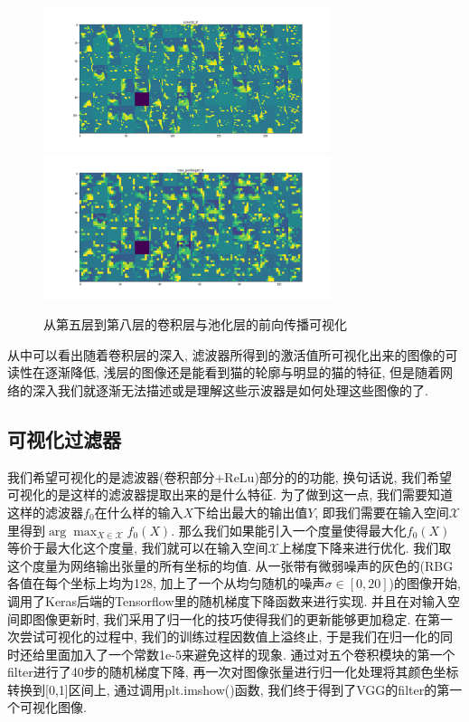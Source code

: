 \documentclass[lang=cn,11pt]{elegantpaper}
\begin{document}
\begin{figure}[hbtp]
  \includegraphics[width=0.75\textwidth]{conv2d_8}\\
  \includegraphics[width=0.75\textwidth]{max_pooling2d_8}
  \caption{从第五层到第八层的卷积层与池化层的前向传播可视化\label{fig:forward1}}
\end{figure}

从中可以看出随着卷积层的深入, 滤波器所得到的激活值所可视化出来的图像的可读性在逐渐降低, 浅层的图像还是能看到猫的轮廓与明显的猫的特征, 但是随着网络的深入我们就逐渐无法描述或是理解这些示波器是如何处理这些图像的了.







\subsection{可视化过滤器}

我们希望可视化的是滤波器(卷积部分+ReLu)部分的的功能, 换句话说, 我们希望可视化的是这样的滤波器提取出来的是什么特征. 为了做到这一点, 我们需要知道这样的滤波器$f_0$在什么样的输入$X$下给出最大的输出值$Y$, 即我们需要在输入空间$\mathcal X$里得到$\arg \max_{X\in \mathcal X} f_0(X)$. 那么我们如果能引入一个度量使得最大化$f_0(X)$等价于最大化这个度量, 我们就可以在输入空间$\mathcal X$上梯度下降来进行优化. 我们取这个度量为网络输出张量的所有坐标的均值. 从一张带有微弱噪声的灰色的(RBG各值在每个坐标上均为128, 加上了一个从均匀随机的噪声$\sigma\in[0,20]$)的图像开始, 调用了Keras后端的Tensorflow里的随机梯度下降函数来进行实现. 并且在对输入空间即图像更新时, 我们采用了归一化的技巧使得我们的更新能够更加稳定. 在第一次尝试可视化的过程中, 我们的训练过程因数值上溢终止, 于是我们在归一化的同时还给里面加入了一个常数1e-5来避免这样的现象. 通过对五个卷积模块的第一个filter进行了40步的随机梯度下降, 再一次对图像张量进行归一化处理将其颜色坐标转换到[0,1]区间上, 通过调用plt.imshow()函数, 我们终于得到了VGG的filter的第一个可视化图像. 
\end{document}
